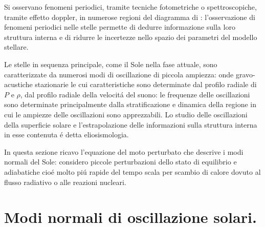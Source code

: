\documentclass[../main.tex]{subfiles}
\begin{document}
Si osservano fenomeni periodici, tramite tecniche fotometriche o spettroscopiche, tramite effetto doppler, in numerose regioni del diagramma di \hr{}: l'osservazione di fenomeni periodici nelle stelle permette di dedurre informazione sulla loro struttura interna e di ridurre le incertezze nello spazio dei parametri del modello stellare.

Le stelle in sequenza principale, come il Sole nella fase attuale, sono caratterizzate da numerosi modi di oscillazione di piccola ampiezza: onde gravo-acustiche stazionarie le cui caratteristiche sono determinate dal profilo radiale di $P$ e $\rho$, dal profilo radiale della velocit\'a del suono: le frequenze delle oscillazioni sono determinate principalmente dalla stratificazione e dinamica della regione in cui le ampiezze delle oscillazioni sono apprezzabili. Lo studio delle oscillazioni della superficie solare e l'estrapolazione delle informazioni sulla struttura interna in esse contenuta \'e detta eliosismologia.


In questa sezione ricavo l'equazione del moto perturbato che descrive i modi normali del Sole: considero piccole perturbazioni dello stato di equilibrio e adiabatiche cio\'e molto pi\'u rapide del tempo scala per scambio di calore dovuto al flusso radiativo o alle reazioni nucleari.



{\let\clearpage\relax\let\cleardoublepage\relax
\chapter{Modi normali di oscillazione solari.}
}
\end{document}
